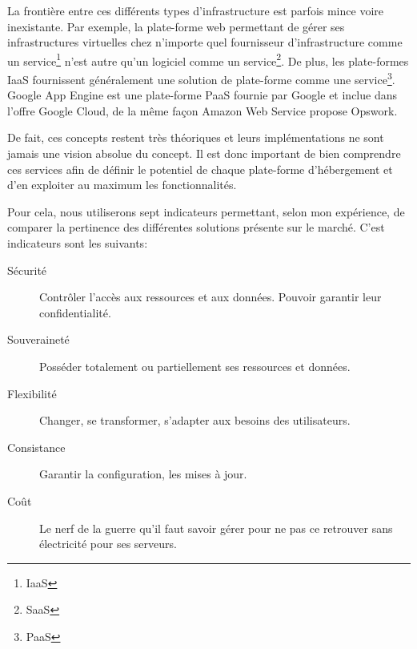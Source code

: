 \documentclass[11pt, a4paper ]{article}
\begin{document}
\begin{spacing}{1.5}
La frontière entre ces différents types d'infrastructure est parfois mince voire inexistante. Par exemple, la plate-forme web permettant de gérer ses infrastructures virtuelles chez n'importe quel fournisseur d'infrastructure comme un service\footnote{IaaS} n'est autre qu'un logiciel comme un service\footnote{SaaS}. De plus, les plate-formes IaaS fournissent généralement une solution de plate-forme comme une service\footnote{PaaS}. Google App Engine est une plate-forme PaaS fournie par Google et inclue dans l'offre Google Cloud, de la même façon Amazon Web Service propose Opswork.

De fait, ces concepts restent très théoriques et leurs implémentations ne sont jamais une vision absolue du concept. Il est donc important de bien comprendre ces services afin de définir le potentiel de chaque plate-forme d'hébergement et d'en exploiter au maximum les fonctionnalités.

Pour cela, nous utiliserons sept indicateurs permettant, selon mon expérience, de comparer la pertinence des différentes solutions présente sur le marché. C'est indicateurs sont les suivants:

\begin{description}

	\item[Sécurité]
		Contrôler l'accès aux ressources et aux données. Pouvoir garantir leur confidentialité.

	\item[Souveraineté]
		Posséder totalement ou partiellement ses ressources et données.

	\item[Flexibilité]
		Changer, se transformer, s'adapter aux besoins des utilisateurs.

	\item[Consistance]
		Garantir la configuration, les mises à jour.

	\item[Coût]
		Le nerf de la guerre qu'il faut savoir gérer pour ne pas ce retrouver sans électricité pour ses serveurs.


\end{description}
\end{spacing}
\end{document}
